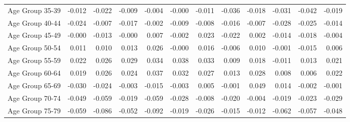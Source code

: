 \begin{table}[htbp]
\begin{tabular}{l*{11}{D{.}{.}{-0.5}}}
Age Group 35-39     &      -0.012         &      -0.022         &      -0.009         &      -0.004         &      -0.000         &      -0.011         &      -0.036\sym{*}  &      -0.018         &      -0.031\sym{**} &      -0.042\sym{***}&      -0.019\sym{***}\\
Age Group 40-44     &      -0.024         &      -0.007         &      -0.017         &      -0.002         &      -0.009         &      -0.008         &      -0.016         &      -0.007         &      -0.028\sym{**} &      -0.025\sym{*}  &      -0.014\sym{**} \\
Age Group 45-49     &      -0.000         &      -0.013         &      -0.000         &       0.007         &      -0.002         &       0.023         &      -0.022         &       0.002         &      -0.014         &      -0.018         &      -0.004         \\
Age Group 50-54     &       0.011         &       0.010         &       0.013         &       0.026         &      -0.000         &       0.016         &      -0.006         &       0.010         &      -0.001         &      -0.015         &       0.006         \\
Age Group 55-59     &       0.022         &       0.026         &       0.029\sym{*}  &       0.034\sym{*}  &       0.038\sym{*}  &       0.033\sym{*}  &       0.009         &       0.018         &      -0.011         &       0.013         &       0.021\sym{***}\\
Age Group 60-64     &       0.019         &       0.026         &       0.024         &       0.037\sym{**} &       0.032         &       0.027         &       0.013         &       0.028\sym{*}  &       0.008         &       0.006         &       0.022\sym{***}\\
Age Group 65-69     &      -0.030         &      -0.024         &      -0.003         &      -0.015         &      -0.003         &       0.005         &      -0.001         &       0.049\sym{***}&       0.014         &      -0.002         &      -0.001         \\
Age Group 70-74     &      -0.049\sym{*}  &      -0.059\sym{***}&      -0.019         &      -0.059\sym{***}&      -0.028         &      -0.008         &      -0.020         &      -0.004         &      -0.019         &      -0.023\sym{*}  &      -0.029\sym{***}\\
Age Group 75-79     &      -0.059\sym{**} &      -0.086\sym{***}&      -0.052\sym{***}&      -0.092\sym{***}&      -0.019         &      -0.026         &      -0.015         &      -0.012         &      -0.062\sym{***}&      -0.057\sym{***}&      -0.048\sym{***}\\

\end{tabular}
\end{table}
